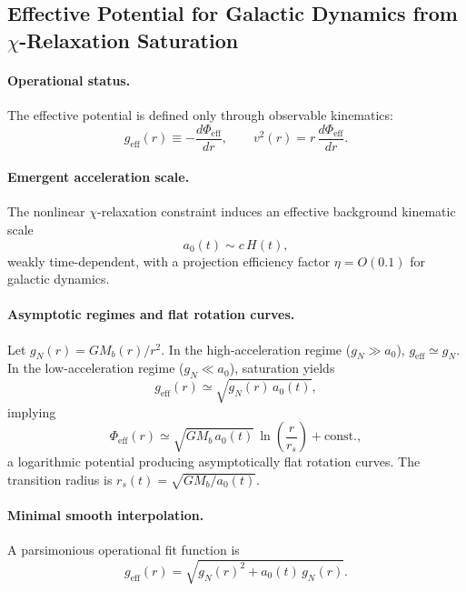 \subsection{Effective Potential for Galactic Dynamics from $\chi$-Relaxation Saturation}
\label{subsec:phi-eff-galaxies}

\paragraph{Operational status.}
The effective potential is defined only through observable kinematics:
\begin{equation}
  g_{\mathrm{eff}}(r) \equiv -\frac{d\Phi_{\mathrm{eff}}}{dr},
  \qquad
  v^2(r) = r\,\frac{d\Phi_{\mathrm{eff}}}{dr}.
\end{equation}

\paragraph{Emergent acceleration scale.}
The nonlinear $\chi$-relaxation constraint induces an effective
background kinematic scale
\begin{equation}
  a_0(t) \sim c\,H(t),
\end{equation}
weakly time-dependent, with a projection efficiency factor
$\eta = O(0.1)$ for galactic dynamics.

\paragraph{Asymptotic regimes and flat rotation curves.}
Let $g_N(r) = GM_b(r)/r^2$.
In the high-acceleration regime ($g_N \gg a_0$), $g_{\mathrm{eff}} \simeq g_N$.
In the low-acceleration regime ($g_N \ll a_0$), saturation yields
\begin{equation}
  g_{\mathrm{eff}}(r)
    \simeq \sqrt{g_N(r)\,a_0(t)},
\end{equation}
implying
\begin{equation}
  \Phi_{\mathrm{eff}}(r)
  \simeq \sqrt{G M_b\,a_0(t)}\,
    \ln\!\left(\frac{r}{r_s}\right) + \mathrm{const.},
  \label{eq:phi-log}
\end{equation}
a logarithmic potential producing asymptotically flat rotation curves.
The transition radius is
$r_s(t) = \sqrt{G M_b / a_0(t)}$.

\paragraph{Minimal smooth interpolation.}
A parsimonious operational fit function is
\begin{equation}
  g_{\mathrm{eff}}(r)
  = \sqrt{g_N(r)^2 + a_0(t)\,g_N(r)}.
  \label{eq:geff-interp}
\end{equation}


